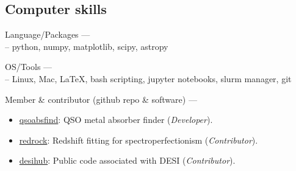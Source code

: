 \documentclass[12pt,letterpaper]{article}
\begin{document}
\subsection{Computer skills}
\begin{list}{}{\cvlist}
\item Language/Packages ---\\
    -- python, numpy, matplotlib, scipy, astropy
\item OS/Tools --- \\
    -- Linux, Mac, \LaTeX, bash scripting, jupyter notebooks, slurm manager, git
\item Member \& contributor (github repo \& software) ---
    \begin{itemize}
        \item[] \href{https://github.com/abhi0395/qsoabsfind}{qsoabsfind}: QSO metal absorber finder (\textit{Developer}).
      \item[] \href{https://github.com/desihub/redrock}{redrock}: Redshift fitting for spectroperfectionism (\textit{Contributor}).
      \item[] \href{https://github.com/desihub}{desihub}: Public code associated with DESI (\textit{Contributor}).
  \end{itemize}
\end{list}

\end{document}
